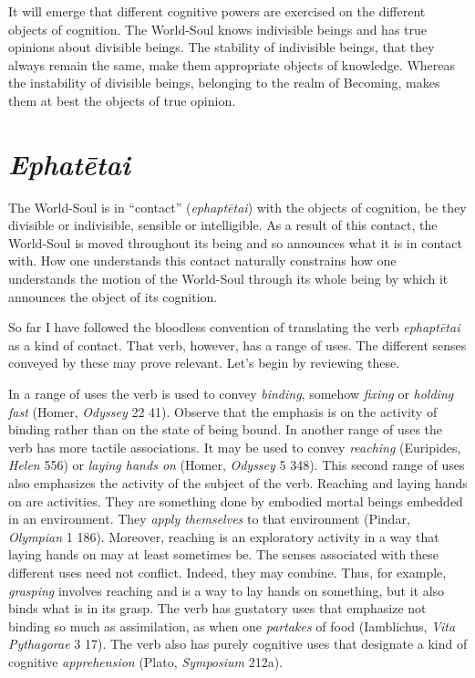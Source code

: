 It will emerge that different cognitive powers are exercised on the different objects of cognition. The World-Soul knows indivisible beings and has true opinions about divisible beings. The stability of indivisible beings, that they always remain the same, make them appropriate objects of knowledge. Whereas the instability of divisible beings, belonging to the realm of Becoming, makes them at best the objects of true opinion.


\section{\emph{Ephatētai}} %
\label{sec:_emph_ephatetai}

The World-Soul is in ``contact'' (\emph{ephaptētai}) with the objects of cognition, be they divisible or indivisible, sensible or intelligible. As a result of this contact, the World-Soul is moved throughout its being and so announces what it is in contact with. How one understands this contact naturally constrains how one understands the motion of the World-Soul through its whole being by which it announces the object of its cognition. 

So far I have followed the bloodless convention of translating the verb \emph{ephaptētai} as a kind of contact. That verb, however, has a range of uses. The different senses conveyed by these may prove relevant. Let's begin by reviewing these.

In a range of uses the verb is used to convey \emph{binding}, somehow \emph{fixing} or \emph{holding fast} (Homer, \emph{Odyssey} 22 41). Observe that the emphasis is on the activity of binding rather than on the state of being bound. In another range of uses the verb has more tactile associations. It may be used to convey \emph{reaching} (Euripides, \emph{Helen} 556) or \emph{laying hands on} (Homer, \emph{Odyssey} 5 348). This second range of uses also emphasizes the activity of the subject of the verb. Reaching and laying hands on are activities. They are something done by embodied mortal beings embedded in an environment. They \emph{apply themselves} to that environment (Pindar, \emph{Olympian} 1 186). Moreover, reaching is an exploratory activity in a way that laying hands on may at least sometimes be. The senses associated with these different uses need not conflict. Indeed, they may combine. Thus, for example, \emph{grasping} involves reaching and is a way to lay hands on something, but it also binds what is in its grasp. The verb has gustatory uses that emphasize not binding so much as assimilation, as when one \emph{partakes} of food (Iamblichus, \emph{Vita Pythagorae} 3 17). The verb also has purely cognitive uses that designate a kind of cognitive \emph{apprehension} (Plato, \emph{Symposium} 212a).

